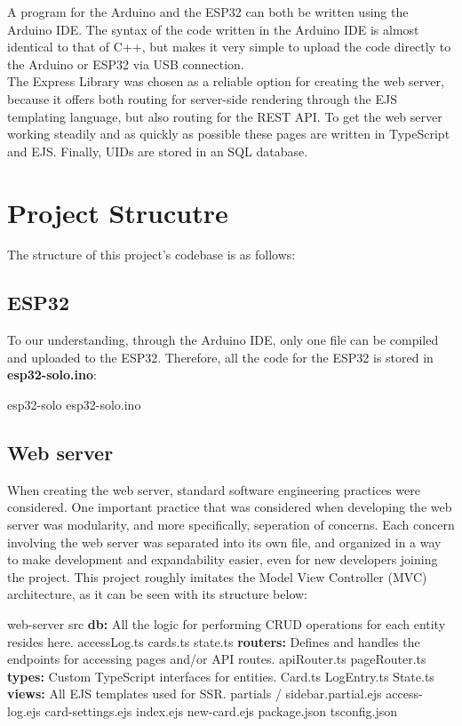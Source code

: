 \documentclass[a4paper,10pt]{article}
\begin{document}
A program for the Arduino and the ESP32 can both be written using the Arduino IDE. The syntax of the code written in the Arduino IDE is almost identical to that of C++, but makes it very simple to upload the code directly to the Arduino or ESP32 via USB connection. \\
The Express Library was chosen as a reliable option for creating the web server, because it offers both routing for server-side rendering through the EJS templating language, but also routing for the REST API.
To get the web server working steadily and as quickly as possible these pages are written in TypeScript and EJS. Finally, UIDs are stored in an SQL database.

\newpage

\section{Project Strucutre}
The structure of this project's codebase is as follows:

\subsection{ESP32}
To our understanding, through the Arduino IDE, only one file can be compiled and uploaded to the ESP32. Therefore, all the code for the ESP32 is stored in \textbf{esp32-solo.ino}:
\begin{outline}
    \1 esp32-solo
        \2 esp32-solo.ino
\end{outline}

\subsection{Web server}
When creating the web server, standard software engineering practices were considered. One important practice that was considered when developing the web server was modularity, and more specifically, seperation of concerns. Each concern involving the web server was separated into its own file, and organized in a way to make development and expandability easier, even for new developers joining the project. This project roughly imitates the Model View Controller (MVC) architecture, as it can be seen with its structure below:
\begin{outline}
    \1 web-server
        \2 src
            \3 \textbf{db:} All the logic for performing CRUD operations for each entity resides here.
                \4 accessLog.ts
                \4 cards.ts
                \4 state.ts
            \3 \textbf{routers:} Defines and handles the endpoints for accessing pages and/or API routes.
                \4 apiRouter.ts
                \4 pageRouter.ts
            \3 \textbf{types:} Custom TypeScript interfaces for entities.
                \4 Card.ts
                \4 LogEntry.ts
                \4 State.ts
            \3 \textbf{views:} All EJS templates used for SSR.
                \4 partials / sidebar.partial.ejs
                \4 access-log.ejs
                \4 card-settings.ejs
                \4 index.ejs
                \4 new-card.ejs
        \2 package.json
        \2 tsconfig.json
\end{outline}
\end{document}
